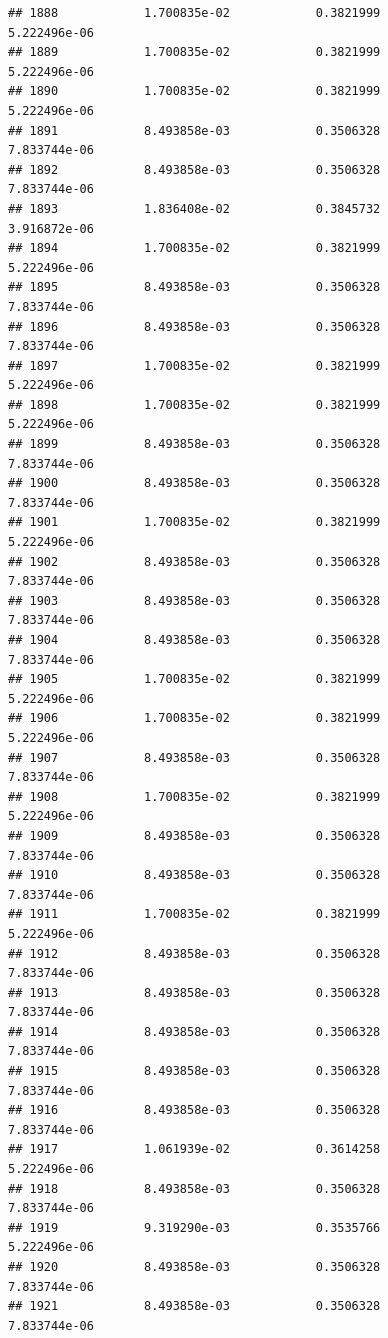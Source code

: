 \documentclass[
]{article}
\begin{document}
\begin{verbatim}
## 1888            1.700835e-02            0.3821999            5.222496e-06
## 1889            1.700835e-02            0.3821999            5.222496e-06
## 1890            1.700835e-02            0.3821999            5.222496e-06
## 1891            8.493858e-03            0.3506328            7.833744e-06
## 1892            8.493858e-03            0.3506328            7.833744e-06
## 1893            1.836408e-02            0.3845732            3.916872e-06
## 1894            1.700835e-02            0.3821999            5.222496e-06
## 1895            8.493858e-03            0.3506328            7.833744e-06
## 1896            8.493858e-03            0.3506328            7.833744e-06
## 1897            1.700835e-02            0.3821999            5.222496e-06
## 1898            1.700835e-02            0.3821999            5.222496e-06
## 1899            8.493858e-03            0.3506328            7.833744e-06
## 1900            8.493858e-03            0.3506328            7.833744e-06
## 1901            1.700835e-02            0.3821999            5.222496e-06
## 1902            8.493858e-03            0.3506328            7.833744e-06
## 1903            8.493858e-03            0.3506328            7.833744e-06
## 1904            8.493858e-03            0.3506328            7.833744e-06
## 1905            1.700835e-02            0.3821999            5.222496e-06
## 1906            1.700835e-02            0.3821999            5.222496e-06
## 1907            8.493858e-03            0.3506328            7.833744e-06
## 1908            1.700835e-02            0.3821999            5.222496e-06
## 1909            8.493858e-03            0.3506328            7.833744e-06
## 1910            8.493858e-03            0.3506328            7.833744e-06
## 1911            1.700835e-02            0.3821999            5.222496e-06
## 1912            8.493858e-03            0.3506328            7.833744e-06
## 1913            8.493858e-03            0.3506328            7.833744e-06
## 1914            8.493858e-03            0.3506328            7.833744e-06
## 1915            8.493858e-03            0.3506328            7.833744e-06
## 1916            8.493858e-03            0.3506328            7.833744e-06
## 1917            1.061939e-02            0.3614258            5.222496e-06
## 1918            8.493858e-03            0.3506328            7.833744e-06
## 1919            9.319290e-03            0.3535766            5.222496e-06
## 1920            8.493858e-03            0.3506328            7.833744e-06
## 1921            8.493858e-03            0.3506328            7.833744e-06

\end{verbatim}
\end{document}
